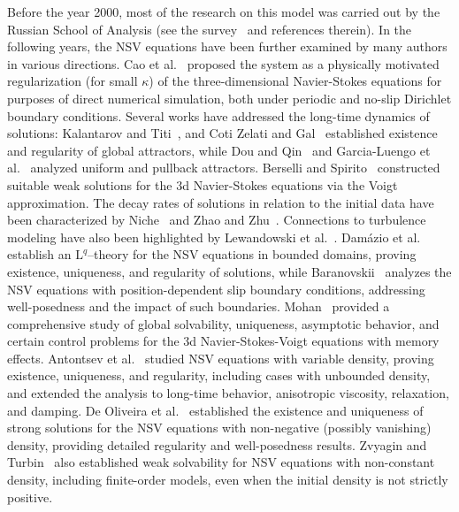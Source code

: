 \documentclass[12pt,reqno]{amsart}
\numberwithin{equation}{section}
\theoremstyle{definition}
\def\L{\mathrm{L}}
\begin{document}
Before the year 2000, most of the research on this model was carried out by the Russian School of Analysis (see the survey~\cite{zvy-2010} and references therein).
In the following years, the NSV equations have been further examined by many authors in various directions.
{Cao et al.}~\cite{CLT:2006} proposed the system as a physically motivated regularization (for small $\kappa$) of the three-dimensional Navier-Stokes equations for purposes of direct numerical simulation, both under periodic and no-slip Dirichlet boundary conditions.
Several works have addressed the long-time dynamics of solutions:
Kalantarov and Titi~\cite{KT:2009}, and {Coti Zelati and Gal}~\cite{C-ZG:2015} established existence and regularity of global attractors,
while {Dou and Qin}~\cite{DYQ:2011} and {Garcia-Luengo et al.}~\cite{G-LM-Rr:2012} analyzed uniform and pullback attractors.
{Berselli and Spirito}~\cite{BS:2017} constructed suitable weak solutions for the 3d Navier-Stokes equations via the Voigt approximation.
The decay rates of solutions in relation to the initial data have been characterized by {Niche}~\cite{Niche:2016} and {Zhao and Zhu}~\cite{ZZ:2015}.
Connections to turbulence modeling have also been highlighted by {Lewandowski et al.}~\cite{Lewandowski:2018}.
{Damázio et al.}~\cite{DMS:2016} establish an $\L^q$--theory for the NSV equations in bounded domains, proving existence, uniqueness, and regularity of solutions, while {Baranovskii}~\cite{Baranovskii:2023} analyzes the NSV equations with position-dependent slip boundary conditions, addressing well-posedness and the impact of such boundaries.
{Mohan}~\cite{Mohan:2020} provided a comprehensive study of global solvability, uniqueness, asymptotic behavior, and certain control problems for the 3d Navier-Stokes-Voigt equations with memory effects.
{Antontsev et al.}~\cite{Ant-Oliv-Khom-2021,Ant-Oliv-2022a,Ant-Oliv-Khom-2022b} studied NSV equations with variable density, proving existence, uniqueness, and regularity, including cases with unbounded density, and extended the analysis to long-time behavior, anisotropic viscosity, relaxation, and damping.
{De Oliveira et al.}~\cite{deOliveira:2025} established the existence and uniqueness of strong solutions for the NSV equations with non-negative (possibly vanishing) density, providing detailed regularity and well-posedness results.
{Zvyagin and Turbin}~\cite{Zvy-Turbin-2023a,Zvy-Turbin-2025} also established weak solvability for NSV equations with non-constant density, including finite-order models, even when the initial density is not strictly positive.
\end{document}
